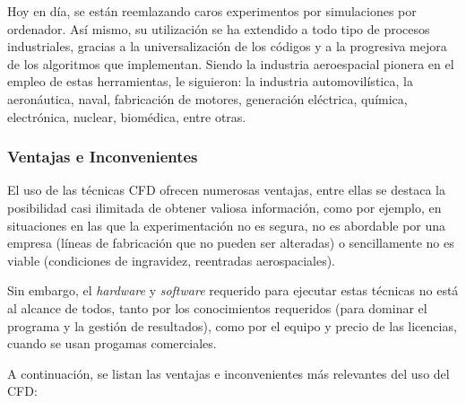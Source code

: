 Hoy en día, se están reemlazando caros experimentos por simulaciones por
ordenador. Así mismo, su utilización se ha extendido a todo tipo de
procesos industriales, gracias a la universalización de los códigos y a
la progresiva mejora de los algoritmos que implementan. Siendo la
industria aeroespacial pionera en el empleo de estas herramientas, le
siguieron: la industria automovilística, la aeronáutica, naval,
fabricación de motores, generación eléctrica, química, electrónica,
nuclear, biomédica, entre otras.

\subsubsection{Ventajas e Inconvenientes}\label{header-n26}

El uso de las técnicas CFD ofrecen numerosas ventajas, entre ellas se
destaca la posibilidad casi ilimitada de obtener valiosa información,
como por ejemplo, en situaciones en las que la experimentación no es
segura, no es abordable por una empresa (líneas de fabricación que no
pueden ser alteradas) o sencillamente no es viable (condiciones de
ingravidez, reentradas aerospaciales).

Sin embargo, el \emph{hardware} y \emph{software} requerido para
ejecutar estas técnicas no está al alcance de todos, tanto por los
conocimientos requeridos (para dominar el programa y la gestión de
resultados), como por el equipo y precio de las licencias, cuando se
usan progamas comerciales.

A continuación, se listan las ventajas e inconvenientes más relevantes
del uso del CFD:

